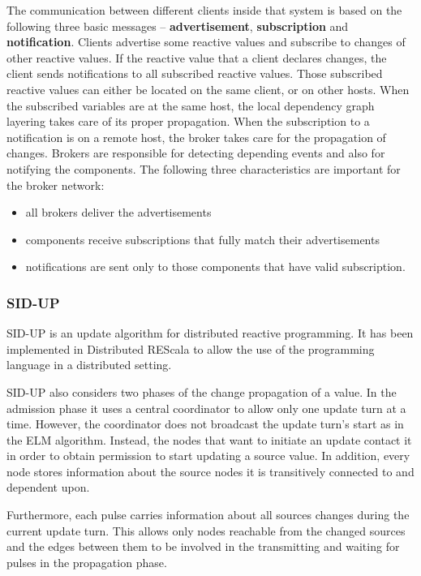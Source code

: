 \documentclass{sigplanconf}
\begin{document}
The communication between different clients inside that system is based on the following three basic messages -- \textbf{advertisement}, \textbf{subscription} and \textbf{notification}.
Clients advertise some reactive values and subscribe to changes of other reactive values. If the reactive value that a client declares changes, the client sends notifications to all subscribed reactive values. Those subscribed reactive values can either be located on the same client, or on other hosts. When the subscribed variables are at the same host, the local dependency graph layering takes care of its proper propagation. When the subscription to a notification is on a remote host, the broker takes care for the propagation of changes. Brokers are responsible for detecting depending events and also for notifying the components. The following three characteristics are important for the broker network:

\begin{itemize}
\item all brokers deliver the advertisements
\item components receive subscriptions that fully match their advertisements
\item notifications are sent only to those components that have valid subscription.
\end{itemize}

\subsubsection{SID-UP}
SID-UP \cite{sidup} is an update algorithm for distributed reactive programming. It has been implemented in Distributed REScala to allow the use of the programming language in a distributed setting.

SID-UP also considers two phases of the change propagation of a value. In the admission phase it uses a central coordinator to allow only one update turn at a time. However, the coordinator does not broadcast the update turn's start as in the ELM algorithm. Instead, the nodes that want to initiate an update contact it in order to obtain permission to start updating a source value. In addition, every node stores information about the source nodes it is transitively connected to and dependent upon.

Furthermore, each pulse carries information about all sources changes during the current update turn. This allows only nodes reachable from the changed sources and the edges between them to be involved in the transmitting and waiting for pulses in the propagation phase.
\end{document}
